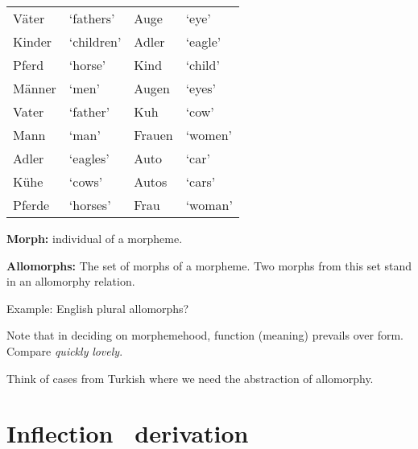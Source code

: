 \documentclass[11pt]{article}
\begin{document}
{\begin{uexercise}
\begin{tabular}{llll}
V\"ater & `fathers' & Auge & `eye'\\
Kinder & `children' & Adler & `eagle'\\
Pferd & `horse' & Kind & `child'\\
M\"anner & `men' & Augen & `eyes'\\
Vater & `father' & Kuh & `cow'\\
Mann & `man' & Frauen & `women'\\
Adler & `eagles' & Auto & `car'\\
K\"uhe & `cows' & Autos & `cars'\\
Pferde & `horses' & Frau & `woman'
\end{tabular}
\end{uexercise}


\item {\bf Morph:} individual  of a morpheme.

\item {\bf Allomorphs:} The set of morphs of a morpheme. Two morphs from this
set stand in an allomorphy relation.

\item Example: English plural allomorphs?



\item Note that in deciding on morphemehood, function (meaning) prevails over form. Compare \emph{quickly} \versus
\emph{lovely}.

\begin{uexercise}
Think of cases from Turkish where we need the abstraction of allomorphy.
\end{uexercise}
}

\section{Inflection \versus\ derivation}
\end{document}
